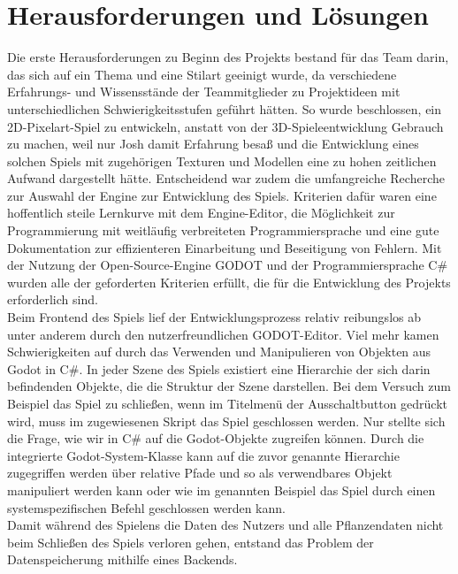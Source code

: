 \chapter{Herausforderungen und Lösungen}\label{ch:herausforderungen}
Die erste Herausforderungen zu Beginn des Projekts bestand für das Team darin, das sich auf ein Thema und eine Stilart
geeinigt wurde, da verschiedene Erfahrungs- und Wissensstände der Teammitglieder zu Projektideen mit unterschiedlichen 
Schwierigkeitsstufen geführt hätten. 
So wurde beschlossen, ein 2D-Pixelart-Spiel zu entwickeln, anstatt von der 3D-Spieleentwicklung Gebrauch zu machen, weil 
nur Josh damit Erfahrung besaß und die Entwicklung eines solchen Spiels mit zugehörigen Texturen und Modellen
eine zu hohen zeitlichen Aufwand dargestellt hätte. 
Entscheidend war zudem die umfangreiche Recherche zur Auswahl der Engine zur Entwicklung des Spiels. 
Kriterien dafür waren eine hoffentlich steile Lernkurve mit dem Engine-Editor, die Möglichkeit zur Programmierung mit 
weitläufig verbreiteten Programmiersprache und eine gute Dokumentation zur effizienteren Einarbeitung und Beseitigung
von Fehlern. 
Mit der Nutzung der Open-Source-Engine GODOT und der Programmiersprache C\# wurden alle der geforderten 
Kriterien erfüllt, die für die Entwicklung des Projekts erforderlich sind. \\
\newline
Beim Frontend des Spiels lief der Entwicklungsprozess relativ reibungslos ab unter anderem durch den nutzerfreundlichen 
GODOT-Editor.
Viel mehr kamen Schwierigkeiten auf durch das Verwenden und Manipulieren von Objekten aus Godot in C\#.
In jeder Szene des Spiels existiert eine Hierarchie der sich darin befindenden Objekte, die die Struktur der Szene
darstellen. 
Bei dem Versuch zum Beispiel das Spiel zu schließen, wenn im Titelmenü der Ausschaltbutton gedrückt wird, muss im 
zugewiesenen Skript das Spiel geschlossen werden. 
Nur stellte sich die Frage, wie wir in C\# auf die Godot-Objekte zugreifen können. 
Durch die integrierte Godot-System-Klasse kann auf die zuvor genannte Hierarchie zugegriffen werden über relative Pfade
und so als verwendbares Objekt manipuliert werden kann oder wie im genannten Beispiel das Spiel durch einen 
systemspezifischen Befehl geschlossen werden kann.\\
\newline
Damit während des Spielens die Daten des Nutzers und alle Pflanzendaten nicht beim Schließen des Spiels 
verloren gehen, entstand das Problem der Datenspeicherung mithilfe eines Backends. 
